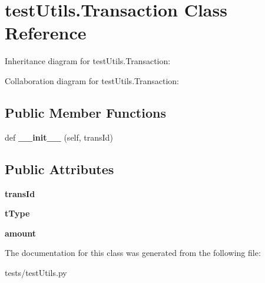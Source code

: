 \hypertarget{classtest_utils_1_1_transaction}{}\section{test\+Utils.\+Transaction Class Reference}
\label{classtest_utils_1_1_transaction}


Inheritance diagram for test\+Utils.\+Transaction\+:


Collaboration diagram for test\+Utils.\+Transaction\+:
\subsection*{Public Member Functions}
\begin{DoxyCompactItemize}
\item 
\mbox{\label{classtest_utils_1_1_transaction_ad01d2588be8ec630368c7b32cfecc202}} 
def {\bfseries \+\_\+\+\_\+init\+\_\+\+\_\+} (self, trans\+Id)
\end{DoxyCompactItemize}
\subsection*{Public Attributes}
\begin{DoxyCompactItemize}
\item 
\mbox{\label{classtest_utils_1_1_transaction_a5193d478ecb7ab04a6986341e0b4c825}} 
{\bfseries trans\+Id}
\item 
\mbox{\label{classtest_utils_1_1_transaction_a9e99ba25d19771f3b6ff3f2caec152b3}} 
{\bfseries t\+Type}
\item 
\mbox{\label{classtest_utils_1_1_transaction_a267718831213d843d3f9359431ec9bab}} 
{\bfseries amount}
\end{DoxyCompactItemize}


The documentation for this class was generated from the following file\+:\begin{DoxyCompactItemize}
\item 
tests/test\+Utils.\+py\end{DoxyCompactItemize}

